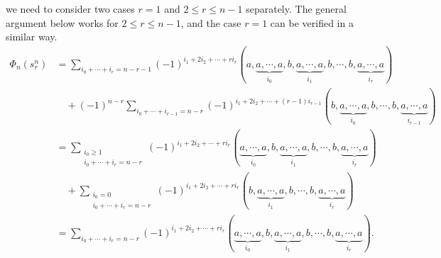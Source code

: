 \documentclass[10pt, reqno]{amsart}
\theoremstyle{definition}
\theoremstyle{remark}
\numberwithin{equation}{section}
\begin{document}
 we need to consider two cases $r=1$ and $2\le r \le n-1$ separately. The general argument below works for \(2\le r \le n-1\), and the case \(r=1\) can be verified in a similar way.
 \[\begin{aligned}
    \Phi_n(s_r^n) &= \sum_{i_0+\cdots+i_r = n-r-1}(-1)^{i_1+2i_2+\cdots+ri_r}(a,\underbrace{a,\cdots,a}_{i_0},b,\underbrace{a,\cdots,a}_{i_1},b,\cdots,b,\underbrace{a,\cdots,a}_{i_r})\\
       &\quad + (-1)^{n-r}\sum_{i_0+\cdots+i_{r-1} = n-r}(-1)^{i_1+2i_2+\cdots+(r-1)i_{r-1}}(b,\underbrace{a,\cdots,a}_{i_0},b,\cdots,b,\underbrace{a,\cdots,a}_{i_{r-1}})\\
       & = \sum_{\substack{i_0\ge 1 \\ i_0+\cdots+i_r = n-r}}(-1)^{i_1+2i_2+\cdots+ri_r}(\underbrace{a,\cdots,a}_{i_0},b,\underbrace{a,\cdots,a}_{i_1},b,\cdots,b,\underbrace{a,\cdots,a}_{i_r})\\
       & \quad + \sum_{\substack{i_0=0 \\ i_0+\cdots+i_r = n-r}}(-1)^{i_1+2i_2+\cdots+ri_r}(b,\underbrace{a,\cdots,a}_{i_1},b,\cdots,b,\underbrace{a,\cdots,a}_{i_r}) \\
       &= \sum_{i_0+\cdots+i_r = n-r}(-1)^{i_1+2i_2+\cdots+ri_r}(\underbrace{a,\cdots,a}_{i_0},b,\underbrace{a,\cdots,a}_{i_1},b,\cdots,b,\underbrace{a,\cdots,a}_{i_r}). 
\end{aligned}\]

\end{document}
